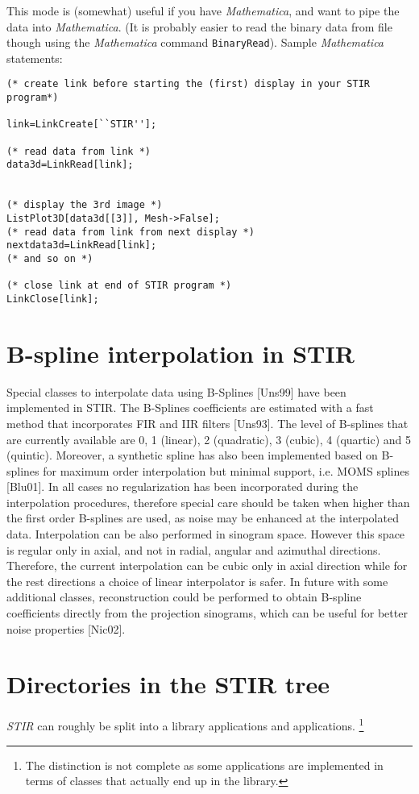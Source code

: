 \documentclass{article}
\begin{document}
{{This mode is (somewhat) useful if you have \textit{Mathematica\texttrademark}, 
and want to pipe the data into \textit{Mathematica}. (It is probably 
easier to read the binary data from file though using the \textit{Mathematica} command \texttt{BinaryRead}). 
Sample \textit{Mathematica} statements:

\begin{verbatim}
(* create link before starting the (first) display in your STIR 
program*)

link=LinkCreate[``STIR''];

(* read data from link *)
data3d=LinkRead[link];


(* display the 3rd image *)
ListPlot3D[data3d[[3]], Mesh->False];
(* read data from link from next display *)
nextdata3d=LinkRead[link];
(* and so on *)

(* close link at end of STIR program *)
LinkClose[link];
\end{verbatim}


\section{B-spline interpolation in STIR}

\label{sec:BSplines}
Special classes to interpolate data using B-Splines [Uns99] have been implemented in STIR. 
The B-Splines coefficients are estimated with a fast method that incorporates FIR and IIR 
filters [Uns93]. The level of B-splines that are currently available are 0, 1 (linear), 
2 (quadratic), 3 (cubic), 4 (quartic) and 5 (quintic). Moreover, a synthetic spline has also been 
implemented based on B-splines for maximum order interpolation but minimal support, i.e. MOMS 
splines [Blu01]. In all cases no regularization has been incorporated during the interpolation 
procedures, therefore special care should be taken when higher than the first order B-splines 
are used, as noise may be enhanced at the interpolated data. Interpolation can be also performed 
in sinogram space. However this space is regular only in axial, and not in radial, angular and 
azimuthal directions. Therefore, the current interpolation can be cubic only in axial direction 
while for the rest directions a choice of linear interpolator is safer. In future with some 
additional classes, reconstruction could be performed to obtain B-spline coefficients directly 
from the projection sinograms, which can be useful for better noise properties [Nic02].

\section{
Directories in the STIR tree}
\textit{STIR} can roughly be split into a library applications and applications.
\footnote{The distinction is not complete as some applications are implemented
in terms of classes that actually end up in the library.}

}}
\end{document}
